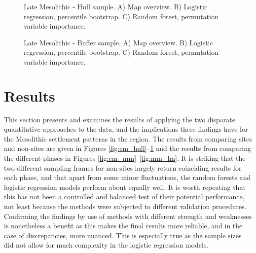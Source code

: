 \documentclass[12pt, a4paper]{article}
\begin{document}
\begin{figure}
	\caption[Late Mesolithic - Hull sample]{Late Mesolithic - Hull sample. A) Map overview. B) Logistic regression, percentile bootstrap. C) Random forest, permutation variable importance.}
	\label{fig:lm_hull}
\bigbreak
	\caption[Late Mesolithic - Buffer sample]{Late Mesolithic - Buffer sample. A) Map overview. B) Logistic regression, percentile bootstrap. C) Random forest, permutation variable importance.}
	\label{fig:lm_buff}
\end{figure}

\section{Results}
This section presents and examines the results of applying the two disparate quantitative approaches to the data, and the implications these findings have for the Mesolithic settlement patterns in the region. The results from comparing sites and non-sites are given in Figures \ref{fig:em_hull}--\ref{fig:lm_buff} and the results from comparing the different phases in Figures \ref{fig:em_mm}--\ref{fig:mm_lm}. It is striking that the two different sampling frames for non-sites largely return coinciding results for each phase, and that apart from some minor fluctuations, the random forests and logistic regression models perform about equally well. It is worth repeating that this has not been a controlled and balanced test of their potential performance, not least because the methods were subjected to different validation procedures. Confirming the findings by use of methods with different strength and weaknesses is nonetheless a benefit as this makes the final results more reliable, and in the case of discrepancies, more nuanced. This is especially true as the sample sizes did not allow for much complexity in the logistic regression models.\par
\end{document}

